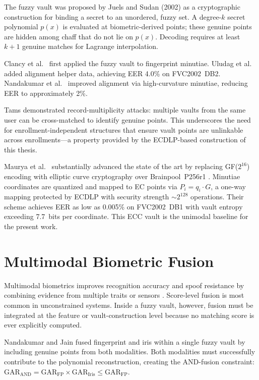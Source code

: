 The fuzzy vault \cite{juels2002fuzzy} was proposed by Juels and Sudan (2002) as
a cryptographic construction for binding a secret to an unordered, fuzzy set.
A degree-$k$ secret polynomial $p(x)$ is evaluated at biometric-derived points;
these genuine points are hidden among chaff that do not lie on $p(x)$.
Decoding requires at least $k{+}1$ genuine matches for Lagrange interpolation.

Clancy et al.\ \cite{clancy2003secure} first applied the fuzzy vault to
fingerprint minutiae. Uludag et al.\ \cite{uludag2005fuzzy} added alignment
helper data, achieving EER 4.0\% on FVC2002~DB2. Nandakumar et
al.\ \cite{nandakumar2007fuzzy} improved alignment via high-curvature minutiae,
reducing EER to approximately 2\%.

Tams \cite{tams2013attacks} demonstrated record-multiplicity attacks: multiple
vaults from the same user can be cross-matched to identify genuine points. This
underscores the need for enrollment-independent structures that ensure vault
points are unlinkable across enrollments---a property provided by the ECDLP-based
construction of this thesis.

Maurya et al.\ \cite{maurya2025enhancing} substantially advanced the state of
the art by replacing GF($2^{16}$) encoding with elliptic curve cryptography over
Brainpool~P256r1 \cite{rfc5639}. Minutiae coordinates are quantized and mapped to
EC points via $P_i = q_i \cdot G$, a one-way mapping protected by ECDLP with
security strength $\sim\!2^{128}$ operations. Their scheme achieves EER as low as
0.005\% on FVC2002~DB1 with vault entropy exceeding 7.7~bits per coordinate. This
ECC vault is the unimodal baseline for the present work.

\section{Multimodal Biometric Fusion}

Multimodal biometrics improves recognition accuracy and spoof resistance by
combining evidence from multiple traits or sensors
\cite{ross2003information,jain2004multibiometrics}. Score-level fusion is most
common in unconstrained systems. Inside a fuzzy vault, however, fusion must be
integrated at the feature or vault-construction level because no matching score
is ever explicitly computed.

Nandakumar and Jain \cite{nandakumar2008multibiometric} fused fingerprint and
iris within a single fuzzy vault by including genuine points from both modalities.
Both modalities must successfully contribute to the polynomial reconstruction,
creating the AND-fusion constraint: $\mathrm{GAR}_\mathrm{AND} =
\mathrm{GAR}_\mathrm{FP} \times \mathrm{GAR}_\mathrm{Iris} \leq
\mathrm{GAR}_\mathrm{FP}$.

